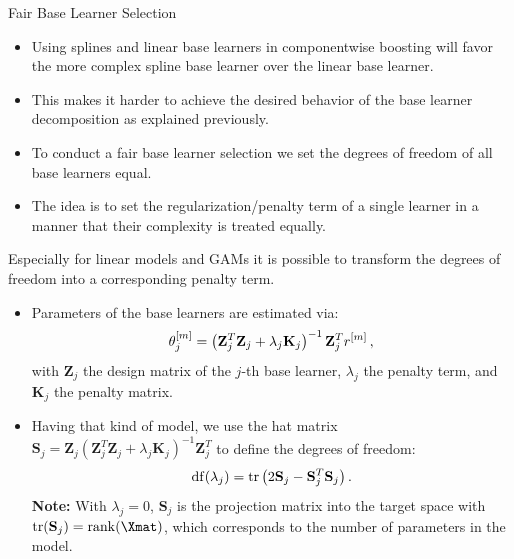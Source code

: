 \begin{vbframe}{Fair Base Learner Selection}

\begin{itemize}

  \item
    Using splines and linear base learners in componentwise boosting will favor 
    the more complex spline base learner over the linear base learner.

  \item
    This makes it harder to achieve the desired behavior of the base learner 
    decomposition as explained previously.

  \item
    To conduct a fair base learner selection we set the degrees of freedom of all base learners equal.

  \item
    The idea is to set the regularization/penalty term of a single learner in a manner that their complexity is treated equally.

\end{itemize}

\framebreak


Especially for linear models and GAMs it is possible to transform the degrees of freedom into a corresponding penalty term.
\begin{itemize}

  \item
    Parameters of the base learners are estimated via:
    $$
    \theta^{[m]}_j = \left(\mathbf{Z}_j^T \mathbf{Z}_j + \lambda_j \mathbf{K}_j
    \right)^{-1}\mathbf{Z}_j^T r^{[m]}\,,
    $$
    with $\mathbf{Z}_j$ the design matrix of the $j$-th base learner, 
    $\lambda_j$ the penalty term, and $\mathbf{K}_j$ the penalty matrix.

  \item
    Having that kind of model, we use the hat matrix 
    $\mathbf{S}_j = \mathbf{Z}_j\left(\mathbf{Z}_j^T \mathbf{Z}_j + 
    \lambda_j \mathbf{K}_j\right)^{-1}\mathbf{Z}_j^T$ to define the degrees of 
    freedom:
    $$
    \operatorname{df}(\lambda_j) = \operatorname{tr}\left(2\mathbf{S}_j - \mathbf{S}_j^T
    \mathbf{S}_j\right).
    $$
    \textbf{Note:} With $\lambda_j = 0$, $\mathbf{S}_j$ is the projection matrix 
    into the target space with 
    $\trace(\mathbf{S}_j) = \operatorname{rank}(\Xmat)$, which corresponds to 
    the number of parameters in the model.


\end{itemize}
\end{vbframe}

